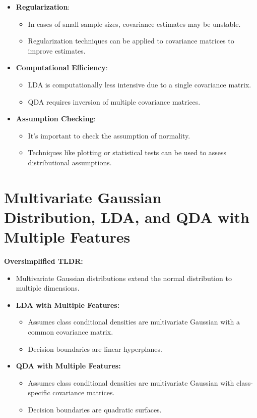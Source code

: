 \documentclass{article}
\begin{document}
\begin{itemize}
  \item \textbf{Regularization}:
  \begin{itemize}
    \item In cases of small sample sizes, covariance estimates may be unstable.
    \item Regularization techniques can be applied to covariance matrices to improve estimates.
  \end{itemize}
  \item \textbf{Computational Efficiency}:
  \begin{itemize}
    \item LDA is computationally less intensive due to a single covariance matrix.
    \item QDA requires inversion of multiple covariance matrices.
  \end{itemize}
  \item \textbf{Assumption Checking}:
  \begin{itemize}
    \item It's important to check the assumption of normality.
    \item Techniques like plotting or statistical tests can be used to assess distributional assumptions.
  \end{itemize}
\end{itemize}

\section{Multivariate Gaussian Distribution, LDA, and QDA with Multiple Features}

\textbf{Oversimplified TLDR:}
\begin{itemize}
    \item Multivariate Gaussian distributions extend the normal distribution to multiple dimensions.
    \item \textbf{LDA with Multiple Features:}
    \begin{itemize}
        \item Assumes class conditional densities are multivariate Gaussian with a common covariance matrix.
        \item Decision boundaries are linear hyperplanes.
    \end{itemize}
    \item \textbf{QDA with Multiple Features:}
    \begin{itemize}
        \item Assumes class conditional densities are multivariate Gaussian with class-specific covariance matrices.
        \item Decision boundaries are quadratic surfaces.
    \end{itemize}
\end{itemize}
\end{document}
